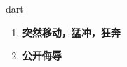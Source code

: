 
\begin{frame}
{\huge dart}
\begin{center}
\begin{enumerate}\Large
  \item \textbf{突然移动，猛冲，狂奔}
  \item \textbf{公开侮辱}
\end{enumerate}
\end{center}
\end{frame}
